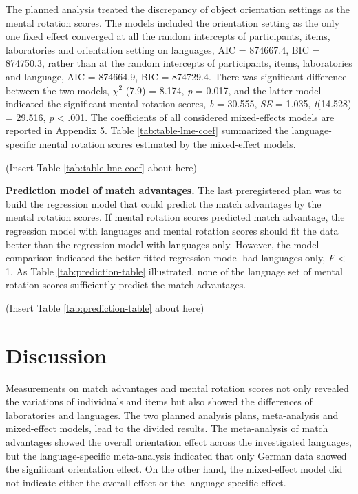 \documentclass[
  man,floatsintext]{apa6}
\begin{document}
The planned analysis treated the discrepancy of object orientation settings as the mental rotation scores. The models included the orientation setting as the only one fixed effect converged at all the random intercepts of participants, items, laboratories and orientation setting on languages, AIC = 874667.4, BIC = 874750.3, rather than at the random intercepts of participants, items, laboratories and language, AIC = 874664.9, BIC = 874729.4. There was significant difference between the two models, \({\chi}^2\) (7,9) = 8.174, \emph{p} = 0.017, and the latter model indicated the significant mental rotation scores, \emph{b} = 30.555, \emph{SE} = 1.035, \emph{t}(14.528) = 29.516, \emph{p} \textless{} .001. The coefficients of all considered mixed-effects models are reported in Appendix 5. Table \ref{tab:table-lme-coef} summarized the language-specific mental rotation scores estimated by the mixed-effect models.

(Insert Table \ref{tab:table-lme-coef} about here)

\textbf{Prediction model of match advantages.} The last preregistered plan was to build the regression model that could predict the match advantages by the mental rotation scores. If mental rotation scores predicted match advantage, the regression model with languages and mental rotation scores should fit the data better than the regression model with languages only. However, the model comparison indicated the better fitted regression model had languages only, \emph{F} \textless{} 1. As Table \ref{tab:prediction-table} illustrated, none of the language set of mental rotation scores sufficiently predict the match advantages.

(Insert Table \ref{tab:prediction-table} about here)

\hypertarget{discussion}{%
\section{Discussion}\label{discussion}}

Measurements on match advantages and mental rotation scores not only revealed the variations of individuals and items but also showed the differences of laboratories and languages. The two planned analysis plans, meta-analysis and mixed-effect models, lead to the divided results. The meta-analysis of match advantages showed the overall orientation effect across the investigated languages, but the language-specific meta-analysis indicated that only German data showed the significant orientation effect. On the other hand, the mixed-effect model did not indicate either the overall effect or the language-specific effect.
\end{document}
